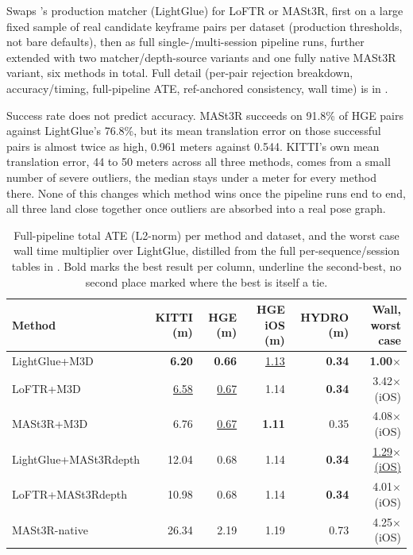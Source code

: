 Swaps 's production matcher (LightGlue) for LoFTR or MASt3R,
first on a large fixed sample of real candidate keyframe pairs per dataset (production thresholds,
not bare defaults), then as full single-/multi-session pipeline runs, further extended with two
matcher/depth-source variants and one fully native MASt3R variant, six methods in total. Full
detail (per-pair rejection breakdown, accuracy/timing, full-pipeline ATE, ref-anchored
consistency, wall time) is in .

Success rate does not predict accuracy. MASt3R succeeds on 91.8\% of HGE pairs against
LightGlue's 76.8\%, but its mean translation error on those successful pairs is almost twice as
high, 0.961 meters against 0.544. KITTI's own mean translation error, 44 to 50 meters across all
three methods, comes from a small number of severe outliers, the median stays under a meter for
every method there. None of this changes which method wins once the pipeline runs end to end, all
three land close together once outliers are absorbed into a real pose graph.

\begin{table}[htb]
  \centering
  \footnotesize
  \begin{tabular*}{\textwidth}{@{\extracolsep{\fill}} lrrrrr}
  \hline
  \textbf{Method} & \textbf{KITTI (m)} & \textbf{HGE (m)} & \textbf{HGE iOS (m)} & \textbf{HYDRO (m)} & \textbf{Wall, worst case} \\
  \hline
  LightGlue+M3D & \textbf{6.20} & \textbf{0.66} & \underline{1.13} & \textbf{0.34} & \textbf{1.00$\times$} \\
  LoFTR+M3D & \underline{6.58} & \underline{0.67} & 1.14 & \textbf{0.34} & 3.42$\times$ (iOS) \\
  MASt3R+M3D & 6.76 & \underline{0.67} & \textbf{1.11} & 0.35 & 4.08$\times$ (iOS) \\
  LightGlue+MASt3Rdepth & 12.04 & 0.68 & 1.14 & \textbf{0.34} & \underline{1.29$\times$ (iOS)} \\
  LoFTR+MASt3Rdepth & 10.98 & 0.68 & 1.14 & \textbf{0.34} & 4.01$\times$ (iOS) \\
  MASt3R-native & 26.34 & 2.19 & 1.19 & 0.73 & 4.25$\times$ (iOS) \\
  \hline
  \end{tabular*}
  \caption[Pose-estimation-method summary, all 6 methods]{Full-pipeline total ATE (L2-norm) per
    method and dataset, and the worst case wall time multiplier over LightGlue, distilled from the
    full per-sequence/session tables in . Bold marks the best
    result per column, underline the second-best, no second place marked where the best is itself
    a tie.}
  \label{tab:ablation-pe-summary}
\end{table}

